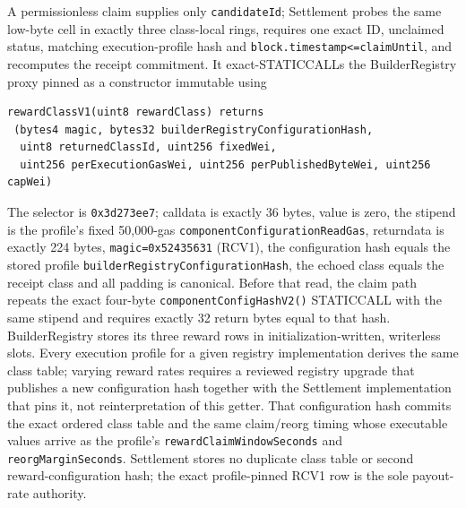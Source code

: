 \documentclass[a4paper,11pt]{article}
\newcommand{\code}[1]{\nolinkurl{#1}}
\begin{document}
A permissionless claim supplies only \code{candidateId}; Settlement probes the
same low-byte cell in exactly three class-local rings, requires one exact ID,
unclaimed status, matching
execution-profile hash and \code{block.timestamp<=claimUntil}, and recomputes
the receipt commitment.  It exact-STATICCALLs the BuilderRegistry proxy pinned
as a constructor immutable using
\begin{verbatim}
rewardClassV1(uint8 rewardClass) returns
 (bytes4 magic, bytes32 builderRegistryConfigurationHash,
  uint8 returnedClassId, uint256 fixedWei,
  uint256 perExecutionGasWei, uint256 perPublishedByteWei, uint256 capWei)
\end{verbatim}
The selector is \code{0x3d273ee7}; calldata is exactly 36 bytes, value is zero,
the stipend is the profile's fixed 50,000-gas
\code{componentConfigurationReadGas}, returndata is exactly 224 bytes,
\code{magic=0x52435631} (RCV1), the configuration hash equals the stored
profile \code{builderRegistryConfigurationHash}, the echoed class equals the
receipt class and all padding is canonical.
Before that read, the claim path repeats the exact four-byte
\code{componentConfigHashV2()} STATICCALL with the same stipend and requires
exactly 32 return bytes equal to that hash.  BuilderRegistry stores its three
reward rows in initialization-written, writerless slots.  Every execution
profile for a given registry implementation derives the same class table;
varying reward rates requires a reviewed registry upgrade that publishes a new
configuration hash together with the Settlement implementation that pins it,
not reinterpretation of this getter.
That configuration hash commits the exact ordered class table and the same
claim/reorg timing whose executable values arrive as the profile's
\code{rewardClaimWindowSeconds} and \code{reorgMarginSeconds}.
Settlement stores no duplicate class table or second reward-configuration hash;
the exact profile-pinned RCV1 row is the sole payout-rate authority.
\end{document}
